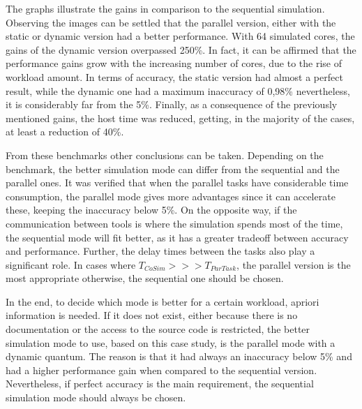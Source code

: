 The graphs illustrate the gains in comparison to the sequential simulation. Observing the images can be settled that the parallel version, either 
with the static or dynamic version had a better performance. With 64 simulated cores, the gains of the dynamic version overpassed 250\%. 
In fact, it can be affirmed that the performance gains grow with the increasing number of cores, due to the rise of workload amount. 
In terms of accuracy, the static version had almost a perfect result, while the dynamic one had 
a maximum inaccuracy of 0,98\% nevertheless, it is considerably far from the 5\%. Finally, as a consequence of the previously mentioned gains,
the host time was reduced, getting, in the majority of the cases, at least a reduction of 40\%. 


From these benchmarks other conclusions can be taken. Depending on the benchmark, the better simulation mode can differ from the sequential and
the parallel ones. It was verified that when the parallel tasks have considerable time consumption, the parallel mode gives more advantages 
since it can accelerate these, keeping the inaccuracy below 5\%. On the opposite way, if the communication between tools is where the simulation 
spends most of the time, the sequential mode will fit better, as it has a greater tradeoff between accuracy and performance. Further, the delay
times between the tasks also play a significant role. In cases where $T_{CoSim} >>> T_{ParTask}$, the parallel version is the most appropriate
otherwise, the sequential one should be chosen. 

In the end, to decide which mode is better for a certain workload, apriori information is needed.
If it does not exist, either because there is no documentation or the access to the source code is restricted, the better simulation mode to use, 
based on this case study, is the parallel mode with a dynamic quantum. The reason is that it had always an inaccuracy below 5\% and 
had a higher performance gain when compared to the sequential version. Nevertheless, if perfect accuracy is the main requirement, the 
sequential simulation mode should always be chosen.





